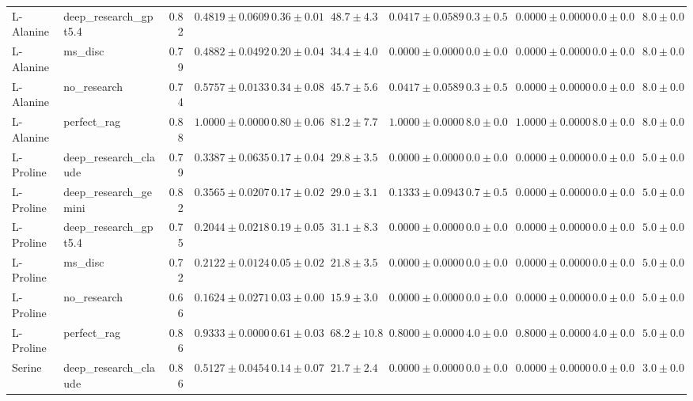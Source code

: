 \begin{table}[htbp]
\begin{tabular}{llrrrrrrrrr}
L-Alanine & deep_research_gpt5.4 & 0.82 & \cellcolor{red!25}$0.4819 \pm 0.0609$ & $0.36 \pm 0.01$ & $48.7 \pm 4.3$ & $0.0417 \pm 0.0589$ & $0.3 \pm 0.5$ & $0.0000 \pm 0.0000$ & $0.0 \pm 0.0$ & $8.0 \pm 0.0$ \\
L-Alanine & ms_disc & 0.79 & $0.4882 \pm 0.0492$ & $0.20 \pm 0.04$ & $34.4 \pm 4.0$ & $0.0000 \pm 0.0000$ & $0.0 \pm 0.0$ & $0.0000 \pm 0.0000$ & $0.0 \pm 0.0$ & $8.0 \pm 0.0$ \\
L-Alanine & no_research & 0.74 & $0.5757 \pm 0.0133$ & $0.34 \pm 0.08$ & $45.7 \pm 5.6$ & $0.0417 \pm 0.0589$ & $0.3 \pm 0.5$ & $0.0000 \pm 0.0000$ & $0.0 \pm 0.0$ & $8.0 \pm 0.0$ \\
L-Alanine & perfect_rag & 0.88 & \cellcolor{green!25}$1.0000 \pm 0.0000$ & $0.80 \pm 0.06$ & $81.2 \pm 7.7$ & $1.0000 \pm 0.0000$ & $8.0 \pm 0.0$ & $1.0000 \pm 0.0000$ & $8.0 \pm 0.0$ & $8.0 \pm 0.0$ \\
\midrule
L-Proline & deep_research_claude & 0.79 & $0.3387 \pm 0.0635$ & $0.17 \pm 0.04$ & $29.8 \pm 3.5$ & $0.0000 \pm 0.0000$ & $0.0 \pm 0.0$ & $0.0000 \pm 0.0000$ & $0.0 \pm 0.0$ & $5.0 \pm 0.0$ \\
L-Proline & deep_research_gemini & 0.82 & $0.3565 \pm 0.0207$ & $0.17 \pm 0.02$ & $29.0 \pm 3.1$ & $0.1333 \pm 0.0943$ & $0.7 \pm 0.5$ & $0.0000 \pm 0.0000$ & $0.0 \pm 0.0$ & $5.0 \pm 0.0$ \\
L-Proline & deep_research_gpt5.4 & 0.75 & $0.2044 \pm 0.0218$ & $0.19 \pm 0.05$ & $31.1 \pm 8.3$ & $0.0000 \pm 0.0000$ & $0.0 \pm 0.0$ & $0.0000 \pm 0.0000$ & $0.0 \pm 0.0$ & $5.0 \pm 0.0$ \\
L-Proline & ms_disc & 0.72 & $0.2122 \pm 0.0124$ & $0.05 \pm 0.02$ & $21.8 \pm 3.5$ & $0.0000 \pm 0.0000$ & $0.0 \pm 0.0$ & $0.0000 \pm 0.0000$ & $0.0 \pm 0.0$ & $5.0 \pm 0.0$ \\
L-Proline & no_research & 0.66 & \cellcolor{red!25}$0.1624 \pm 0.0271$ & $0.03 \pm 0.00$ & $15.9 \pm 3.0$ & $0.0000 \pm 0.0000$ & $0.0 \pm 0.0$ & $0.0000 \pm 0.0000$ & $0.0 \pm 0.0$ & $5.0 \pm 0.0$ \\
L-Proline & perfect_rag & 0.86 & \cellcolor{green!25}$0.9333 \pm 0.0000$ & $0.61 \pm 0.03$ & $68.2 \pm 10.8$ & $0.8000 \pm 0.0000$ & $4.0 \pm 0.0$ & $0.8000 \pm 0.0000$ & $4.0 \pm 0.0$ & $5.0 \pm 0.0$ \\
\midrule
Serine & deep_research_claude & 0.86 & \cellcolor{red!25}$0.5127 \pm 0.0454$ & $0.14 \pm 0.07$ & $21.7 \pm 2.4$ & $0.0000 \pm 0.0000$ & $0.0 \pm 0.0$ & $0.0000 \pm 0.0000$ & $0.0 \pm 0.0$ & $3.0 \pm 0.0$ \\

\end{tabular}
\end{table}
